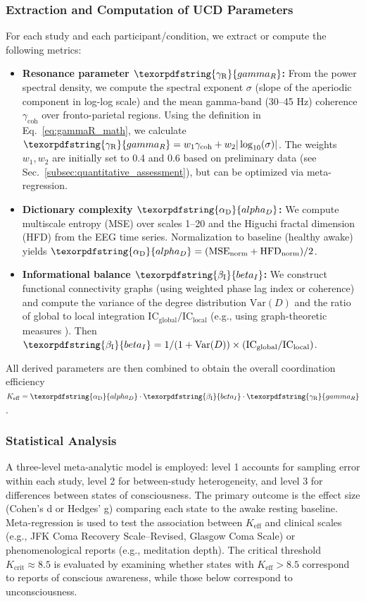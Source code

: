 \documentclass[12pt,a4paper]{article}
\DeclareRobustCommand{\alD}{\texorpdfstring{\ensuremath{\alpha_{\mathrm{D}}}}{alpha_D}}
\DeclareRobustCommand{\beI}{\texorpdfstring{\ensuremath{\beta_{\mathrm{I}}}}{beta_I}}
\DeclareRobustCommand{\gaR}{\texorpdfstring{\ensuremath{\gamma_{\mathrm{R}}}}{gamma_R}}
\newcommand{\Ke}{K_{\mathrm{eff}}}
\begin{document}
	\subsubsection{Extraction and Computation of UCD Parameters}
	For each study and each participant/condition, we extract or compute the following metrics:
	\begin{itemize}
		\item \textbf{Resonance parameter \(\gaR\):} From the power spectral density, we compute the spectral exponent \(\sigma\) (slope of the aperiodic component in log-log scale) and the mean gamma-band (30–45 Hz) coherence \(\gamma_{\text{coh}}\) over fronto-parietal regions. Using the definition in Eq.~\eqref{eq:gammaR_math}, we calculate \(\gaR = w_1 \gamma_{\text{coh}} + w_2 |\log_{10}(\sigma)|\). The weights \(w_1, w_2\) are initially set to 0.4 and 0.6 based on preliminary data (see Sec.~\ref{subsec:quantitative_assessment}), but can be optimized via meta-regression.
		\item \textbf{Dictionary complexity \(\alD\):} We compute multiscale entropy (MSE) \cite{Costa2005} over scales 1–20 and the Higuchi fractal dimension (HFD) \cite{Higuchi1988} from the EEG time series. Normalization to baseline (healthy awake) yields \(\alD = (\text{MSE}_{\text{norm}} + \text{HFD}_{\text{norm}})/2\).
		\item \textbf{Informational balance \(\beI\):} We construct functional connectivity graphs (using weighted phase lag index or coherence) and compute the variance of the degree distribution \(\text{Var}(D)\) and the ratio of global to local integration \(\text{IC}_{\text{global}}/\text{IC}_{\text{local}}\) (e.g., using graph-theoretic measures \cite{Stam2014, Kumar2024}). Then \(\beI = 1/(1+\text{Var}(D)) \times (\text{IC}_{\text{global}}/\text{IC}_{\text{local}})\).
	\end{itemize}
	All derived parameters are then combined to obtain the overall coordination efficiency \(\Ke = \alD \cdot \beI \cdot \gaR\).
	
	\subsubsection{Statistical Analysis}
	A three-level meta-analytic model is employed: level 1 accounts for sampling error within each study, level 2 for between-study heterogeneity, and level 3 for differences between states of consciousness. The primary outcome is the effect size (Cohen's d or Hedges' g) comparing each state to the awake resting baseline. Meta-regression is used to test the association between \(\Ke\) and clinical scales (e.g., JFK Coma Recovery Scale–Revised, Glasgow Coma Scale) or phenomenological reports (e.g., meditation depth). The critical threshold \(K_{\text{crit}} \approx 8.5\) is evaluated by examining whether states with \(\Ke > 8.5\) correspond to reports of conscious awareness, while those below correspond to unconsciousness.
	
\end{document}
